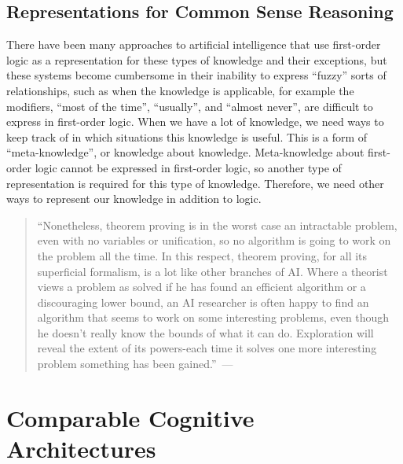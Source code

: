 

\subsection{Representations for Common Sense Reasoning}

There have been many approaches to artificial intelligence that use
first-order logic as a representation for these types of knowledge and
their exceptions, but these systems become cumbersome in their
inability to express ``fuzzy'' sorts of relationships, such as when
the knowledge is applicable, for example the modifiers, ``most of the
time'', ``usually'', and ``almost never'', are difficult to express in
first-order logic.  When we have a lot of knowledge, we need ways to
keep track of in which situations this knowledge is useful.  This is a
form of ``meta-knowledge'', or knowledge about knowledge.
Meta-knowledge about first-order logic cannot be expressed in
first-order logic, so another type of representation is required for
this type of knowledge.  Therefore, we need other ways to represent
our knowledge in addition to logic.

\begin{quote}
``Nonetheless, theorem proving is in the worst case an intractable
  problem, even with no variables or unification, so no algorithm is
  going to work on the problem all the time. In this respect, theorem
  proving, for all its superficial formalism, is a lot like other
  branches of AI.  Where a theorist views a problem as solved if he
  has found an efficient algorithm or a discouraging lower bound, an
  AI researcher is often happy to find an algorithm that seems to work
  on some interesting problems, even though he doesn't really know the
  bounds of what it can do. Exploration will reveal the extent of its
  powers-each time it solves one more interesting problem something
  has been
  gained.''~---~
\end{quote}


\section{Comparable Cognitive Architectures}

